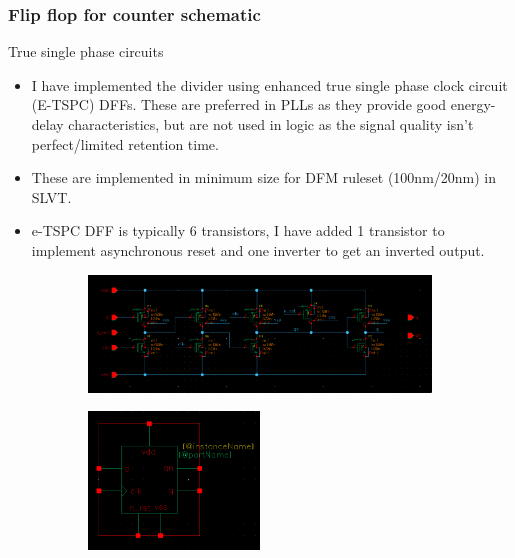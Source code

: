 \documentclass[t, screen, aspectratio=43]{beamer}
\begin{document}
\begin{frame}
	\frametitle{Flip flop for counter schematic}
	\begin{block}{True single phase circuits}
	\tiny
	\begin{itemize}[itemsep=4pt,label=\protect---]
		\item I have implemented the divider using enhanced true single phase clock circuit (E-TSPC) DFFs. These are preferred in PLLs as they provide good energy-delay characteristics, but are not used in logic as the signal quality isn't perfect/limited retention time. 
		\item These are implemented in minimum size for DFM ruleset (100nm/20nm) in SLVT. 
		\item e-TSPC DFF is typically 6 transistors, I have added 1 transistor to implement asynchronous reset and one inverter to get an inverted output. 
	\end{itemize}
	\begin{figure}[htb!]
	    \centering
	    \begin{subfigure}{0.6\textwidth}
	        \centering
	        \center\includegraphics[width=1\textwidth, angle=0]{etspc_dff_schem.png}
	    \end{subfigure}%
	    \begin{subfigure}{0.5\textwidth}
	        \centering
	        \center\includegraphics[width=0.5\textwidth, angle=0]{etspc_dff_symbol.png}
	    \end{subfigure}
	\end{figure}
	\end{block}	
\end{frame}
\end{document}
